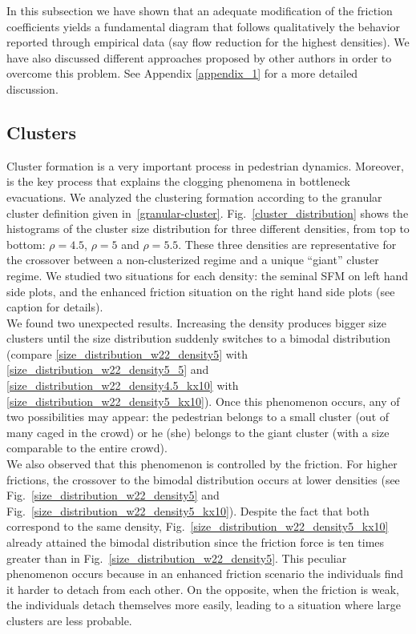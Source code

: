In this subsection we have shown that an adequate modification of the friction coefficients yields a fundamental diagram that follows qualitatively the behavior reported through empirical data (say flow reduction for the highest densities). We have also discussed different approaches proposed by other authors in order to overcome this problem. See Appendix \ref{appendix_1} for a more detailed discussion.\\

\subsection{\label{clusters}Clusters}

Cluster formation is a very important process in pedestrian dynamics. Moreover, is the key process that explains the clogging phenomena in bottleneck evacuations. We analyzed the clustering formation according to the granular cluster definition given in~\ref{granular-cluster}. Fig.~\ref{cluster_distribution} shows the histograms of the cluster size distribution for three different densities, from top to bottom: $\rho=4.5$, $\rho=5$ and $\rho=5.5$. {\color{red} These three
densities are representative for the crossover between
a non-clusterized regime and a unique “giant” cluster
regime. We studied two situations for each density: the
seminal SFM on left hand side plots, and the enhanced
friction situation on the right hand side plots (see
caption for details).}\\

We found two unexpected results. Increasing the density produces bigger size clusters until the size distribution suddenly switches to a bimodal distribution (compare \ref{size_distribution_w22_density5} with \ref{size_distribution_w22_density5_5} and \ref{size_distribution_w22_density4.5_kx10} with \ref{size_distribution_w22_density5_kx10}). {\color{red} Once
this phenomenon occurs, any of two possibilities may
appear: the pedestrian belongs to a small cluster (out
of many caged in the crowd) or he (she) belongs to the
giant cluster (with a size comparable to the entire crowd).}\\

We also observed that this phenomenon is controlled by the friction. For higher frictions, the crossover to the bimodal distribution occurs at lower densities (see Fig.~\ref{size_distribution_w22_density5} and Fig.~\ref{size_distribution_w22_density5_kx10}). Despite the fact that both correspond to the same density, Fig.~\ref{size_distribution_w22_density5_kx10} already attained the bimodal distribution since the friction force is ten times greater than in Fig.~\ref{size_distribution_w22_density5}. This peculiar phenomenon
occurs because in an enhanced friction scenario the
individuals find it harder to detach from each other. On
the opposite, when the friction is weak, the individuals
detach themselves more easily, leading to a situation
where large clusters are less probable.\\

